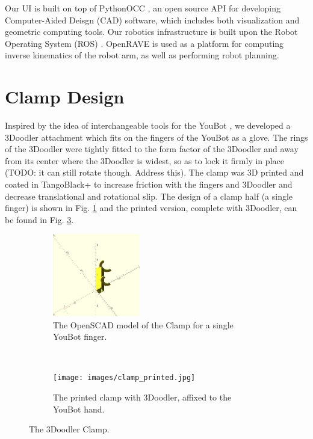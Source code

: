 \documentclass[conference]{acmsiggraph}
\begin{document}
Our UI is built on top of PythonOCC \cite{PythonOCC}, an open source API for developing Computer-Aided Deisgn (CAD) software, which includes both visualization and geometric computing tools.  Our robotics infrastructure is built upon the Robot Operating System (ROS) \cite{ROS}.  OpenRAVE \cite{OpenRAVE} is used as a platform for computing inverse kinematics of the robot arm, as well as performing robot planning.




\section{Clamp Design}
Inspired by the idea of interchangeable tools for the YouBot \cite{Knepper13}, we developed a 3Doodler attachment which fits on the fingers of the YouBot as a glove.  The rings of the 3Doodler were tightly fitted to the form factor of the 3Doodler and away from its center where the 3Doodler is widest, so as to lock it firmly in place (TODO: it can still rotate though.  Address this). The clamp was 3D printed and coated in TangoBlack+ \cite{TangoBlack} to increase friction with the fingers and 3Doodler and decrease translational and rotational slip.  The design of a clamp half (a single finger) is shown in Fig. \ref{fig:halfclamp} and the printed version, complete with 3Doodler, can be found in Fig. \ref{fig:printedclamp}.  

\begin{figure}[t!]
\centering

\begin{subfigure}[t]{1.5in}
\centering
\includegraphics[width=1.5in]{images/clamp.png}
\caption{The OpenSCAD model of the Clamp for a single YouBot finger.}
\label{fig:halfclamp}
\end{subfigure}
~
\begin{subfigure}[t]{1.5in}
\centering
\texttt{[image: images/clamp\_printed.jpg]}
\caption{The printed clamp with 3Doodler, affixed to the YouBot hand.}
\label{fig:printedclamp}
\end{subfigure}
\caption{The 3Doodler Clamp.}
\end{figure}
\end{document}
